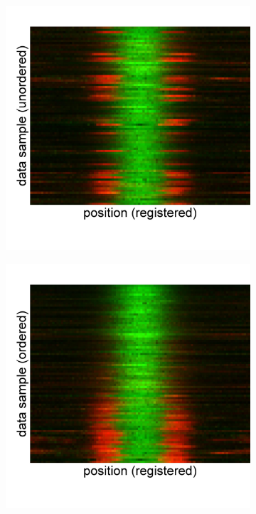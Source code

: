 \documentclass{pnastwo}
\begin{document}
\begin{figure}
\begin{subfigure}{0.2\textwidth}
\caption{}
\label{subfig:1d_unaligned_unordered}
\end{subfigure}
\begin{subfigure}{0.2\textwidth}
\includegraphics[width=\textwidth]{registered_unordered_1d}
\caption{}
\label{subfig:1d_aligned_unordered}
\end{subfigure}
\begin{subfigure}{0.2\textwidth}
\includegraphics[width=\textwidth]{registered_ordered_1d}

\end{subfigure}
\end{figure}
\end{document}
